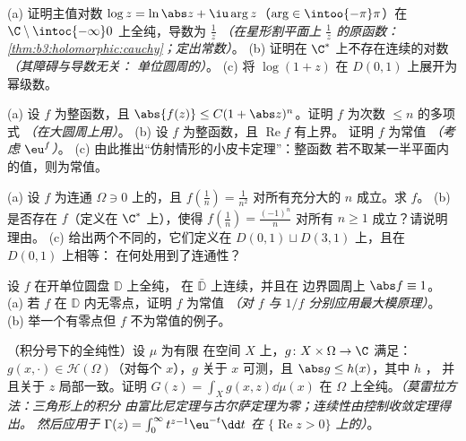 \begin{exercise}[$\star\star$]\label{exo:b3:holomorphic:3}
(a) 证明主值对数 $\log z = \ln\abs z +
\iu\arg z$（$\arg \in \intoo{-\pi}\pi$）在
$\C\setminus\intoc{-\infty}0$ 上全纯，导数为 $\frac1z$
\emph{（在星形割平面上 $\frac1z$ 的原函数：
\cref{thm:b3:holomorphic:cauchy}；定出常数）}。
(b) 证明在
$\C^*$ 上不存在连续的对数 \emph{（其障碍与导数无关：
单位圆周的）}。
(c) 将 $\log(1 + z)$ 在 $D(0,1)$ 上展开为幂级数。
\end{exercise}

\begin{exercise}[$\star\star$]\label{exo:b3:holomorphic:4}
(a) 设 $f$ 为整函数，且 $\abs{f(z)} \leq C(1 + \abs
z)^{n}$。证明 $f$ 为次数 $\leq n$ 的多项式
\emph{（在大圆周上用）}。
(b) 设 $f$ 为整函数，且 $\operatorname{Re}f$ 有上界。
证明 $f$ 为常值 \emph{（考虑 $\eu^{f}$）}。
(c) 由此推出“仿射情形的小皮卡定理”：整函数
若不取某一半平面内的值，则为常值。
\end{exercise}

\begin{exercise}[$\star\star$]\label{exo:b3:holomorphic:5}
(a) 设 $f$ 为连通 $\Omega \ni 0$ 上的，且
$f(\frac1n) = \frac1{n^2}$ 对所有充分大的 $n$ 成立。求 $f$。
(b) 是否存在 $f$（定义在 $\C^*$ 上），使得 $f(\frac1n) =
\frac{(-1)^n}{n}$ 对所有 $n \geq 1$ 成立？请说明理由。
(c) 给出两个不同的，它们定义在
$D(0,1)\sqcup D(3,1)$ 上，且在 $D(0,1)$ 上相等：
在何处用到了连通性？
\end{exercise}

\begin{exercise}[$\star\star$]\label{exo:b3:holomorphic:6}
设 $f$ 在开单位圆盘 $\mathbb D$ 上全纯，
在 $\bar{\mathbb D}$ 上连续，并且在
边界圆周上 $\abs f \equiv 1$。
(a) 若 $f$ 在 $\mathbb D$ 内无零点，证明 $f$ 为常值
\emph{（对 $f$ 与 $1/f$ 分别应用最大模原理）}。
(b) 举一个有零点但 $f$ 不为常值的例子。
\end{exercise}

\begin{exercise}[$\star\star$]\label{exo:b3:holomorphic:7}
（积分号下的全纯性）设 $\mu$ 为有限
在空间 $X$ 上，$g \colon X\times\Omega \to \C$ 满足：
$g(x, \cdot) \in \mathcal H(\Omega)$（对每个 $x$），$g$
关于 $x$ 可测，且 $\abs g \leq h(x)$，其中 $h$ ，
并且关于 $z$ 局部一致。证明 $G(z) = \int_Xg(x, z)\dd\mu(x)$
在 $\Omega$ 上全纯。\emph{（莫雷拉方法：三角形上的积分
由富比尼定理与古尔萨定理为零；连续性由控制收敛定理得出。
然后应用于 $\Gamma(z) =
\int_0^\infty t^{z-1}\eu^{-t}\dd t$ 在 $\{\operatorname{Re}z >
0\}$ 上的）}。
\end{exercise}

